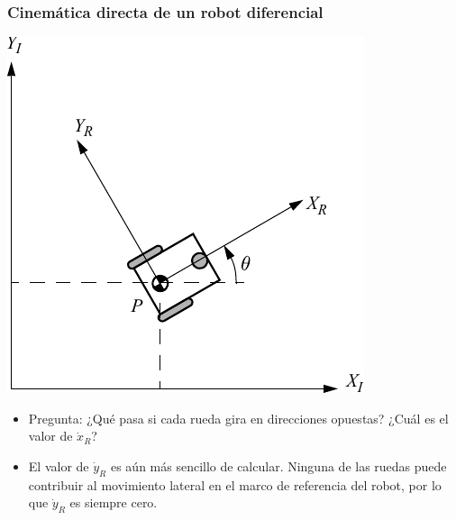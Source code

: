 \begin{frame}
    \frametitle{Cinemática directa de un robot diferencial}
    \footnotesize
    \begin{center}
        \includegraphics[width=0.3\columnwidth]{./images/coordinate_systems.pdf}
    \end{center}
    
    
    \begin{itemize}
        \item Pregunta: ¿Qué pasa si cada rueda gira en direcciones opuestas? ¿Cuál es el valor de $\dot{x}_{R}$?
        
        
        
        
        \item El valor de $\dot{y}_{R}$ es aún más sencillo de calcular. Ninguna de las ruedas puede contribuir al movimiento lateral en el marco de referencia del robot, por lo que $\dot{y}_{R}$ es siempre cero.
    \end{itemize}
    

\end{frame}

